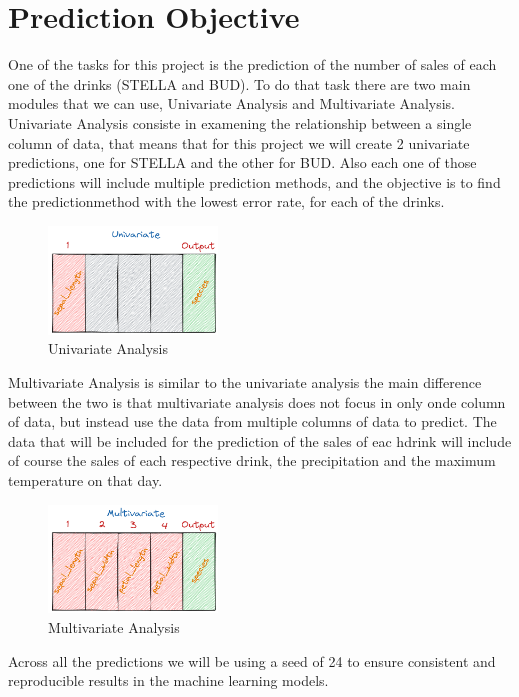 \newpage

\section{Prediction Objective}

\quad One of the tasks for this project is the prediction of the number of sales of each one of the drinks (STELLA and BUD). To do that task there are two main modules that we can use, Univariate Analysis and Multivariate Analysis.\\

Univariate Analysis consiste in examening the relationship between a single column of data, that means that for this project we will create 2 univariate predictions, one for STELLA and the other for BUD. Also each one of those predictions will include multiple prediction methods, and the objective is to find the predictionmethod with the lowest error rate, for each of the drinks.

\begin{figure}[H]
    \centering
    \includegraphics[width=0.4\textwidth]{assets/univariate_dataset.png}
    \caption{Univariate Analysis}
    \label{fig:univariate_dataset}
    \end{figure}

Multivariate Analysis is similar to the univariate analysis the main difference between the two is that multivariate analysis does not focus in only onde column of data, but instead use the data from multiple columns of data to predict. The data that will be included for the prediction of the sales of eac hdrink will include of course the sales of each respective drink, the precipitation and the maximum temperature on that day.


\begin{figure}[H]
    \centering
    \includegraphics[width=0.4\textwidth]{assets/multivariate_dataset.png}
    \caption{Multivariate Analysis}
    \label{fig:mulivariate_dataset}
    \end{figure}

Across all the predictions we will be using a seed of 24 to ensure consistent and reproducible results in the machine learning models.\\







